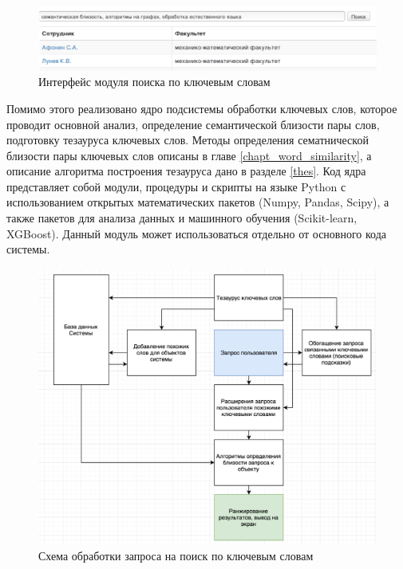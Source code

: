 \begin{figure}[ht]
  \begin{minipage}[ht]{1.0\linewidth}\centering
    \includegraphics[width=0.95\linewidth]{Dissertation/pics/search}
    \caption{Интерфейс модуля поиска по ключевым словам}
  \end{minipage}
  \label{img:search}
\end{figure}

Помимо этого реализовано ядро подсистемы обработки ключевых слов, которое проводит основной анализ, определение семантической близости пары слов, подготовку тезауруса ключевых слов. Методы определения сематнической близости пары ключевых слов описаны в главе \ref{chapt_word_similarity}, а описание алгоритма построения тезауруса дано в разделе \ref{thes}. Код ядра представляет собой модули, процедуры и скрипты на языке Python с использованием открытых математических пакетов (Numpy, Pandas, Scipy), а также пакетов для анализа данных и машинного обучения (Scikit-learn, XGBoost). Данный модуль может использоваться отдельно от основного кода системы.

\begin{figure}[ht]
  \begin{minipage}[ht]{1.0\linewidth}\centering
    \includegraphics[width=0.95\linewidth]{Dissertation/pics/search_2}
    \caption{Схема обработки запроса на поиск по ключевым словам}
  \end{minipage}
  \label{img:search_2}
\end{figure}

